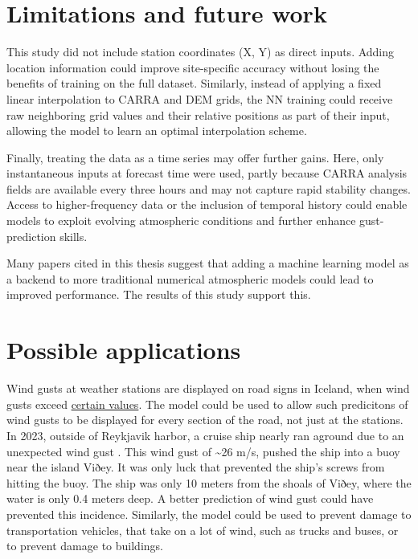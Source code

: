 \section{Limitations and future work}
This study did not include station coordinates (X, Y) as direct inputs. Adding location information could improve site-specific accuracy without losing the benefits of training on the full dataset. Similarly, instead of applying a fixed linear interpolation to CARRA and DEM grids, the NN training could receive raw neighboring grid values and their relative positions as part of their input, allowing the model to learn an optimal interpolation scheme.

Finally, treating the data as a time series may offer further gains. Here, only instantaneous inputs at forecast time were used, partly because CARRA analysis fields are available every three hours and may not capture rapid stability changes. Access to higher-frequency data or the inclusion of temporal history could enable models to exploit evolving atmospheric conditions and further enhance gust-prediction skills.

Many papers cited in this thesis suggest that adding a machine learning model as a backend to more traditional numerical atmospheric models could lead to improved performance. The results of this study support this.

\section{Possible applications}
Wind gusts at weather stations are displayed on road signs in Iceland, when wind gusts exceed \href{https://www.vegagerdin.is/vegagerdin/starfsemi/frettir/tvo-ny-vedur-og-upplysingaskilti-i-notkun#}{certain values}. The model could be used to allow such predicitons of wind gusts to be displayed for every section of the road, not just at the stations. In 2023, outside of Reykjavik harbor, a cruise ship nearly ran aground due to an unexpected wind gust \parencite{strand_skemmtiferdaskips}. This wind gust of \textasciitilde 26 m/s, pushed the ship into a buoy near the island Viðey. It was only luck that prevented the ship's screws from hitting the buoy. The ship was only 10 meters from the shoals of Viðey, where the water is only 0.4 meters deep. A better prediction of wind gust could have prevented this incidence. Similarly, the model could be used to prevent damage to transportation vehicles, that take on a lot of wind, such as trucks and buses, or to prevent damage to buildings.

